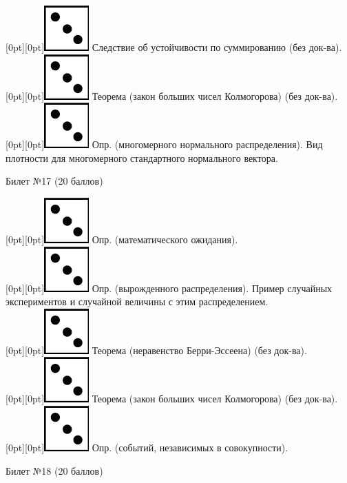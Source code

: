 \documentclass[10pt]{article}
\begin{document}
\raisebox{-1pt}[0pt][0pt]{\includegraphics[width=0.02\linewidth]{3.png}} Следствие об устойчивости по суммированию (без док-ва). \\
\raisebox{-1pt}[0pt][0pt]{\includegraphics[width=0.02\linewidth]{3.png}} Теорема (закон больших чисел Колмогорова) (без док-ва). \\
\raisebox{-1pt}[0pt][0pt]{\includegraphics[width=0.02\linewidth]{3.png}} Опр. (многомерного нормального распределения). Вид плотности для многомерного стандартного нормального вектора. \\ 
\begin{center} {\Large Билет №17 (20 баллов)} \end{center}
\raisebox{-1pt}[0pt][0pt]{\includegraphics[width=0.02\linewidth]{3.png}} Опр. (математического ожидания). \\
\raisebox{-1pt}[0pt][0pt]{\includegraphics[width=0.02\linewidth]{3.png}} Опр. (вырожденного распределения). Пример случайных экспериментов и случайной величины с этим распределением. \\
\raisebox{-1pt}[0pt][0pt]{\includegraphics[width=0.02\linewidth]{3.png}} Теорема (неравенство Берри-Эссеена) (без док-ва). \\
\raisebox{-1pt}[0pt][0pt]{\includegraphics[width=0.02\linewidth]{3.png}} Теорема (закон больших чисел Колмогорова) (без док-ва). \\
\raisebox{-1pt}[0pt][0pt]{\includegraphics[width=0.02\linewidth]{3.png}} Опр. (событий, независимых в совокупности). \\
\begin{center} {\Large Билет №18 (20 баллов)} \end{center}
\end{document}
